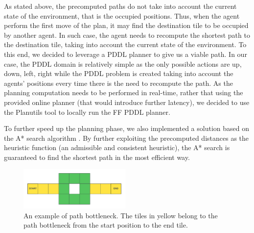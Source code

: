 As stated above, the precomputed paths do not take into account the current state of the environment, that is the occupied positions. Thus, when the agent perform the first move of the plan, it may find the destination tile to be occupied by another agent. In such case, the agent needs to recompute the shortest path to the destination tile, taking into account the current state of the environment. To this end, we decided to leverage a PDDL planner to give us a viable path. In our case, the PDDL domain is relatively simple as the only possible actions are up, down, left, right while the PDDL problem is created taking into account the agents' positions every time there is the need to recompute the path. As the planning computation needs to be performed in real-time, rather that using the provided online planner (that would introduce further latency), we decided to use the Planutils tool \parencite{planutils} to locally run the FF PDDL planner.

To further speed up the planning phase, we also implemented a  solution based on the A* search algorithm \parencite{a*}. By further exploiting the precomputed distances as the heuristic function (an admissible and consistent heuristic), the A* search is guaranteed to find the shortest path in the most efficient way.

\begin{figure}
    \centering
    \includegraphics[width=0.49\textwidth]{figures/path-bottleneck.png}
    \caption{An example of path bottleneck. The tiles in yellow belong to the path bottleneck from the start position to the end tile.}
    \label{fig:path-bottleneck}
\end{figure}
